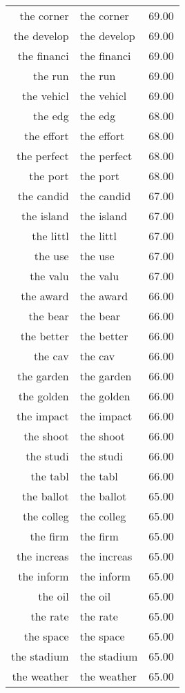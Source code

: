 \begin{table}[ht]
\begin{tabular}{rlr}
  the corner & the corner & 69.00 \\ 
  the develop & the develop & 69.00 \\ 
  the financi & the financi & 69.00 \\ 
  the run & the run & 69.00 \\ 
  the vehicl & the vehicl & 69.00 \\ 
  the edg & the edg & 68.00 \\ 
  the effort & the effort & 68.00 \\ 
  the perfect & the perfect & 68.00 \\ 
  the port & the port & 68.00 \\ 
  the candid & the candid & 67.00 \\ 
  the island & the island & 67.00 \\ 
  the littl & the littl & 67.00 \\ 
  the use & the use & 67.00 \\ 
  the valu & the valu & 67.00 \\ 
  the award & the award & 66.00 \\ 
  the bear & the bear & 66.00 \\ 
  the better & the better & 66.00 \\ 
  the cav & the cav & 66.00 \\ 
  the garden & the garden & 66.00 \\ 
  the golden & the golden & 66.00 \\ 
  the impact & the impact & 66.00 \\ 
  the shoot & the shoot & 66.00 \\ 
  the studi & the studi & 66.00 \\ 
  the tabl & the tabl & 66.00 \\ 
  the ballot & the ballot & 65.00 \\ 
  the colleg & the colleg & 65.00 \\ 
  the firm & the firm & 65.00 \\ 
  the increas & the increas & 65.00 \\ 
  the inform & the inform & 65.00 \\ 
  the oil & the oil & 65.00 \\ 
  the rate & the rate & 65.00 \\ 
  the space & the space & 65.00 \\ 
  the stadium & the stadium & 65.00 \\ 
  the weather & the weather & 65.00 \\ 

\end{tabular}
\end{table}
